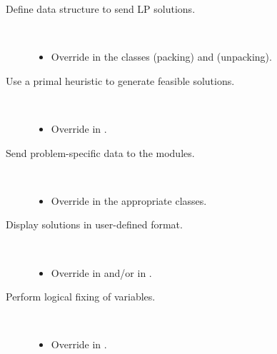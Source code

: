 \begin{description}
\item[Define data structure to send LP solutions.]\ \\
  \vspace{-4ex}
  \begin{itemize}
    \setlength{\itemindent}{-4ex}
    \setlength{\itemsep}{-.5ex}
  \item Override 
    in the classes  (packing) and 
     (unpacking).
  \end{itemize}

\item[Use a primal heuristic to generate feasible solutions.]\ \\
  \vspace{-4ex}
  \begin{itemize}
    \setlength{\itemindent}{-4ex}
    \setlength{\itemsep}{-.5ex}
  \item Override  in 
    .
  \end{itemize}

\item[Send problem-specific data to the modules.]\ \\
  \vspace{-4ex}
  \begin{itemize}
    \setlength{\itemindent}{-4ex}
    \setlength{\itemsep}{-.5ex}
  \item Override  in the appropriate 
     classes.
  \end{itemize}

\item[Display solutions in user-defined format.]\ \\
  \vspace{-4ex}
  \begin{itemize}
    \setlength{\itemindent}{-4ex}
    \setlength{\itemsep}{-.5ex}
  \item Override  in  
    and/or  in .
  \end{itemize}

\item[Perform logical fixing of variables.]\ \\
  \vspace{-4ex}
  \begin{itemize}
    \setlength{\itemindent}{-4ex}
    \setlength{\itemsep}{-.5ex}
  \item Override  in .
  \end{itemize}

\end{description}


